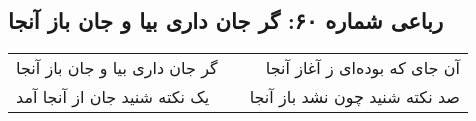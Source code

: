 \begin{center}
\section*{رباعی شماره ۶۰: گر جان داری بیا و جان باز آنجا}
\label{sec:0060}
\begin{longtable}{l p{0.5cm} r}
گر جان داری بیا و جان باز آنجا
&&
آن جای که بوده‌ای ز آغاز آنجا
\\
یک نکته شنید جان از آنجا آمد
&&
صد نکته شنید چون نشد باز آنجا
\\
\end{longtable}
\end{center}
